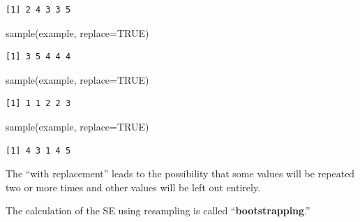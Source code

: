 \documentclass[
  letterpaper,
  DIV=11,
  numbers=noendperiod,
  oneside]{scrreprt}
\newenvironment{Shaded}{\begin{snugshade}}{\end{snugshade}}
\newcommand{\AttributeTok}[1]{\textcolor[rgb]{0.40,0.45,0.13}{#1}}
\newcommand{\ConstantTok}[1]{\textcolor[rgb]{0.56,0.35,0.01}{#1}}
\newcommand{\FunctionTok}[1]{\textcolor[rgb]{0.28,0.35,0.67}{#1}}
\newcommand{\NormalTok}[1]{\textcolor[rgb]{0.00,0.23,0.31}{#1}}
\begin{document}
\begin{verbatim}
[1] 2 4 3 3 5
\end{verbatim}

\begin{Shaded}
\begin{Highlighting}[]
\FunctionTok{sample}\NormalTok{(example, }\AttributeTok{replace=}\ConstantTok{TRUE}\NormalTok{)}
\end{Highlighting}
\end{Shaded}

\begin{verbatim}
[1] 3 5 4 4 4
\end{verbatim}

\begin{Shaded}
\begin{Highlighting}[]
\FunctionTok{sample}\NormalTok{(example, }\AttributeTok{replace=}\ConstantTok{TRUE}\NormalTok{)}
\end{Highlighting}
\end{Shaded}

\begin{verbatim}
[1] 1 1 2 2 3
\end{verbatim}

\begin{Shaded}
\begin{Highlighting}[]
\FunctionTok{sample}\NormalTok{(example, }\AttributeTok{replace=}\ConstantTok{TRUE}\NormalTok{)}
\end{Highlighting}
\end{Shaded}

\begin{verbatim}
[1] 4 3 1 4 5
\end{verbatim}

The ``with replacement'' leads to the possibility that some values will
be repeated two or more times and other values will be left out
entirely.

The calculation of the SE using resampling is called
``\textbf{bootstrapping}.''
\end{document}
